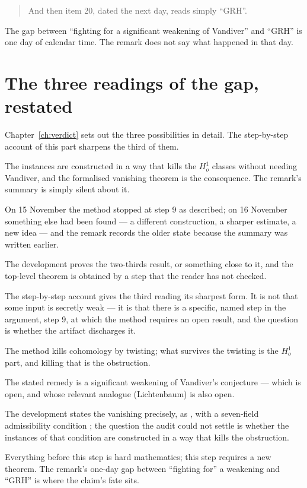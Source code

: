 \begin{quote}
And then item 20, dated the next day, reads simply ``GRH''.
\end{quote}

The gap between ``fighting for a significant weakening of Vandiver'' and
``GRH'' is one day of calendar time. The remark does not say what happened in
that day.

\section{The three readings of the gap, restated}Chapter~\ref{ch:verdict} sets out the three possibilities in detail. The
step-by-step account of this part sharpens the third of them.

\begin{description}[style=nextline,leftmargin=0pt,labelwidth=0pt,labelsep=0pt,font=\sffamily\bfseries\small,
  itemsep=6pt]
\item[\textbf{A. The artifact contains the weakening.}] The
 instances are constructed in a way that kills the $H^1_o$
classes without needing Vandiver, and the formalised vanishing theorem
 is the consequence. The remark's summary is simply silent
about it.
\item[\textbf{B. The remark is out of date.}] On 15 November the method
stopped at step 9 as described; on 16 November something else had been found
--- a different construction, a sharper estimate, a new idea --- and the
remark records the older state because the summary was written earlier.
\item[\textbf{C. The formal theorem is weaker than the headline.}] The
development proves the two-thirds result, or something close to it, and the
top-level theorem is obtained by a step that the reader has not checked.
\end{description}

The step-by-step account gives the third reading its sharpest form. It is not
that some input is secretly weak --- it is that there is a specific, named
step in the argument, step 9, at which the method requires an open result, and
the question is whether the artifact discharges it.

\begin{keytakeaways}
\item The method kills cohomology by twisting; what survives the twisting is
the $H^1_o$ part, and killing that is the obstruction.
\item The stated remedy is a significant weakening of Vandiver's conjecture ---
which is open, and whose relevant analogue (Lichtenbaum) is also open.
\item The development states the vanishing precisely, as , with
a seven-field admissibility condition ; the question the audit
could not settle is whether the instances of that condition are constructed
in a way that kills the obstruction.
\item Everything before this step is hard mathematics; this step requires a new
theorem. The remark's one-day gap between ``fighting for'' a weakening and
``GRH'' is where the claim's fate sits.
\end{keytakeaways}
